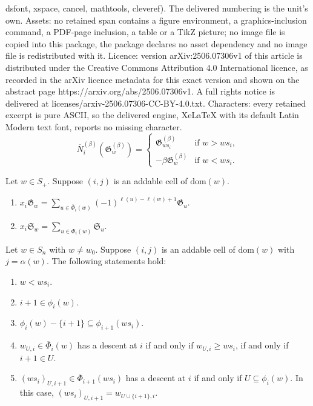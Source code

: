 \documentclass[10pt,a4paper]{amsart}
\newcommand{\addable}{\alpha}
\newcommand{\cotransitionindices}{\phi}
\newcommand{\cotransitionperms}{\Phi}
\newcommand{\dom}{\mathrm{dom}}
\newcommand{\kcotransitionperms}{\overline{\Phi}}
\newcommand{\kdivdiff}{\overline{N}}
\begin{document}
dsfont, xspace, cancel, mathtools, cleveref). The delivered numbering is the unit's own. Assets: no retained span contains a figure environment, a graphics-inclusion command, a PDF-page inclusion, a table or a TikZ picture; no image file is copied into this package, the package declares no asset dependency and no image file is redistributed with it. Licence: version arXiv:2506.07306v1 of this article is distributed under the Creative Commons Attribution 4.0 International licence, as recorded in the arXiv licence metadata for this exact version and shown on the abstract page https://arxiv.org/abs/2506.07306v1. A full rights notice is delivered at licenses/arxiv-2506.07306-CC-BY-4.0.txt. Characters: every retained excerpt is pure ASCII, so the delivered engine, XeLaTeX with its default Latin Modern text font, reports no missing character.
	\begin{equation}\label{eq:grothdivdiffbeta}
		\kdivdiff^{(\beta)}_i(\mathfrak{G}^{(\beta)}_w) = 
		\begin{cases}
			\mathfrak{G}^{(\beta)}_{ws_i} &\text{if } w > ws_i, \\
			-\beta \mathfrak{G}^{(\beta)}_{w} &\text {if } w < ws_i.
		\end{cases}
	\end{equation}

	\begin{proposition}
		\label{prop:kcotransition}
		Let $w \in S_+$. Suppose $(i,j)$ is an addable cell of $\dom(w)$.
		\begin{enumerate}
			\item $\displaystyle x_i\mathfrak{G}_w = \sum_{u \in \kcotransitionperms_i(w)} (-1)^{\ell(u) - \ell(w) + 1}\mathfrak{G}_u$.
			\item $x_i \displaystyle \mathfrak{S}_w = \sum_{u \in \cotransitionperms_i(w)} \mathfrak{S}_{u}$.
		\end{enumerate}
	\end{proposition}

		\begin{lemma} 
			\label{lemma:kcotransitiondescents}
			Let $w \in S_{n} $ with $w \neq w_0$. Suppose $(i,j)$ is an addable cell of $\dom(w)$ with $j = \addable(w)$.
			The following statements hold:
			\begin{enumerate}
				\item $w < ws_i$.
				\item $i + 1 \in \cotransitionindices_i(w)$.
				\item $\cotransitionindices_i(w)-\{i + 1\} \subseteq \cotransitionindices_{i + 1}(ws_i)$.
				\item $w_{U,i} \in \kcotransitionperms_i(w)$ has a descent at $i$ if and only if $w_{U,i}\geq ws_i$, if and only if $i + 1 \in U$.
				\item $(ws_i)_{U,i+1} \in \kcotransitionperms_{i + 1}(ws_i)$ has a descent at $i$ if and only if $U \subseteq \cotransitionindices_i(w)$. 
				In this case, $(ws_i)_{U,i + 1}=w_{U \cup \{i + 1\},i}$.
			\end{enumerate}
		\end{lemma}
\end{document}
